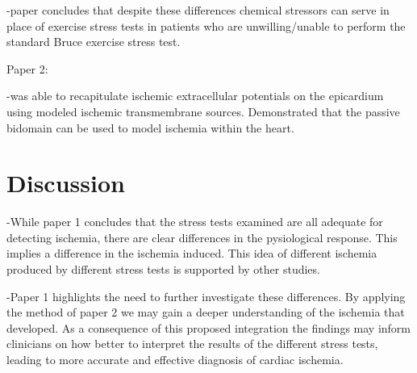 \documentclass[12pt]{article}
\begin{document}
-paper concludes that despite these differences chemical stressors can serve in place of exercise stress tests in patients who are unwilling/unable to perform the standard Bruce exercise stress test.

Paper 2:

-was able to recapitulate ischemic extracellular potentials on the epicardium using modeled ischemic transmembrane sources. Demonstrated that the passive bidomain can be used to model ischemia within the heart.


\section{Discussion}

-While paper 1 concludes that the stress tests examined are all adequate for detecting ischemia, there are clear differences in the pysiological response. This implies a difference in the ischemia induced. This idea of different ischemia produced by different stress tests is supported by other studies.\cite{Zenger2019}

-Paper 1 highlights the need to further investigate these differences. By applying the method of paper 2 we may gain a deeper understanding of the ischemia that developed. As a consequence of this proposed integration the findings may inform clinicians on how better to interpret the results of the different stress tests, leading to more accurate and effective diagnosis of cardiac ischemia.




\end{document}
